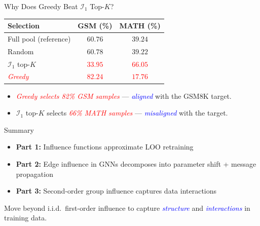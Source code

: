 \documentclass[aspectratio=169]{beamer}
\renewcommand{\emph}[1]{\textit{\textcolor{blue}{#1}}}
\newcommand{\remph}[1]{\textit{\textcolor{red}{#1}}}
\begin{document}
\begin{frame}{Why Does Greedy Beat $\mathcal{I}_1$ Top-$K$?}

    \vspace{0.4cm}
    \begin{center}
    \small
    \begin{tabular}{lcc}
        \toprule
        \textbf{Selection} & \textbf{GSM (\%)} & \textbf{MATH (\%)} \\
        \midrule
        Full pool (reference)          & $60.76$                           & $39.24$                           \\
        Random                         & $60.78$                           & $39.22$                           \\
        $\mathcal{I}_1$ top-$K$        & \remph{$33.95$}                   & \remph{$66.05$}                   \\
        \remph{Greedy}                 & \remph{$\bm{82.24}$}              & \remph{$\bm{17.76}$}              \\
        \bottomrule
    \end{tabular}
    \end{center}

    \vspace{0.4cm}
    \pause
    \begin{itemize}\setlength\itemsep{0.25em}
        \item \remph{Greedy selects 82\% GSM samples} --- \emph{aligned} with the GSM8K target.
        \item $\mathcal{I}_1$ top-$K$ selects \remph{66\% MATH samples}  --- \emph{misaligned} with the target.
    \end{itemize}
\end{frame}


\begin{frame}{Summary}
    \begin{itemize}
        \item \textbf{Part 1:} Influence functions approximate LOO retraining
        \vspace{0.2cm}
        \item \textbf{Part 2:} Edge influence in GNNs decomposes into parameter shift + message propagation
        \vspace{0.2cm}
        \item \textbf{Part 3:} Second-order group influence captures data interactions
    \end{itemize}

    \vspace{0.5cm}
    Move beyond i.i.d.\ first-order influence to capture \emph{structure} and \emph{interactions} in training data.
\end{frame}
\end{document}
